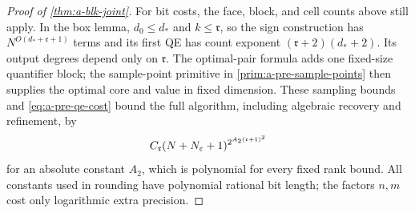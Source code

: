 \begin{proof}[Proof of \cref{thm:a-blk-joint}]
For bit costs, the face, block, and cell counts above still apply.
In the box lemma, $d_0\le d_*$ and $k\le\mathfrak r$, so the sign
construction has $N^{O(d_*+\mathfrak r+1)}$ terms and its first QE
has count exponent $(\mathfrak r+2)(d_*+2)$. Its output degrees depend
only on $\mathfrak r$. The optimal-pair formula adds one fixed-size
quantifier block; the sample-point primitive in
\cref{prim:a-pre-sample-points} then supplies the
optimal core and value in fixed dimension. These sampling bounds and
\cref{eq:a-pre-qe-cost} bound the full algorithm,
including algebraic recovery and refinement, by
\[
 C_{\mathfrak r}(N+N_\varepsilon+1)^{2^{A_2(\mathfrak r+1)^2}}
\]
for an absolute constant $A_2$, which is polynomial for every fixed
rank bound. All constants used in rounding have polynomial rational bit
length; the factors $n,m$ cost only logarithmic extra precision.
\end{proof}

